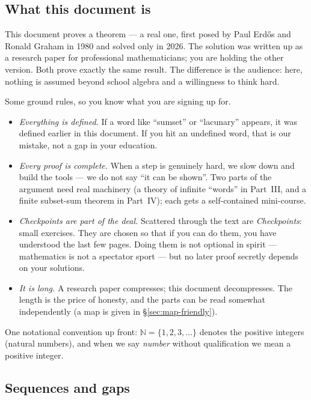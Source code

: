 \documentclass[11pt,reqno]{amsart}
\theoremstyle{plain}
\theoremstyle{definition}
\theoremstyle{remark}
\newcommand{\NN}{\mathbb{N}}
\begin{document}
\subsection{What this document is}

This document proves a theorem --- a real one, first posed by Paul Erd\H{o}s and Ronald
Graham in 1980 and solved only in 2026. The solution was written up as a research paper
for professional mathematicians; you are holding the other version. Both prove exactly
the same result. The difference is the audience: here, nothing is assumed beyond school
algebra and a willingness to think hard.

Some ground rules, so you know what you are signing up for.

\begin{itemize}
\item \emph{Everything is defined.} If a word like ``sumset'' or ``lacunary'' appears,
      it was defined earlier in this document. If you hit an undefined word, that is our
      mistake, not a gap in your education.
\item \emph{Every proof is complete.} When a step is genuinely hard, we slow down and
      build the tools --- we do not say ``it can be shown''. Two parts of the argument
      need real machinery (a theory of infinite ``words'' in Part~III, and a finite
      subset-sum theorem in Part~IV); each gets a self-contained mini-course.
\item \emph{Checkpoints are part of the deal.} Scattered through the text are
      \emph{Checkpoints}: small exercises. They are chosen so that if you can do them,
      you have understood the last few pages. Doing them is not optional in spirit ---
      mathematics is not a spectator sport --- but no later proof secretly depends on
      your solutions.
\item \emph{It is long.} A research paper compresses; this document decompresses. The
      length is the price of honesty, and the parts can be read somewhat independently
      (a map is given in \S\ref{sec:map-friendly}).
\end{itemize}

One notational convention up front: $\NN = \{1, 2, 3, \dots\}$ denotes the positive
integers (natural numbers), and when we say \emph{number} without qualification we mean
a positive integer.

\subsection{Sequences and gaps}
\end{document}
